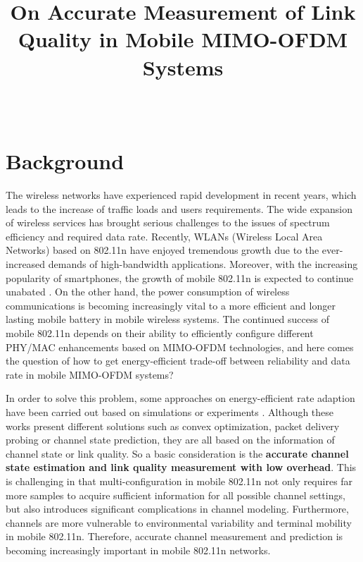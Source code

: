 \documentclass[draftclsnofoot,journal,onecolumn,11pt]{IEEEtran}
\begin{document}
\title{On Accurate Measurement of Link Quality in Mobile MIMO-OFDM Systems}
\author{ \\
}
\maketitle



\section{Background}

The wireless networks have experienced rapid development in recent years, which leads to the increase of traffic loads and users requirements. The wide expansion of wireless services has brought serious challenges to the issues of spectrum efficiency and required data rate. Recently, WLANs (Wireless Local Area Networks) based on 802.11n have enjoyed tremendous growth due to the ever-increased demands of high-bandwidth applications. Moreover, with the increasing popularity of smartphones, the growth of mobile 802.11n is expected to continue unabated \cite{Bala2010wifi}. On the other hand, the power consumption of wireless communications is becoming increasingly vital to a more efficient and longer lasting mobile battery in mobile wireless systems. The continued success of mobile 802.11n depends on their ability to efficiently configure different PHY/MAC enhancements based on MIMO-OFDM technologies, and here comes the question of how to get energy-efficient trade-off between reliability and data rate in mobile MIMO-OFDM systems?

In order to solve this problem, some approaches on energy-efficient rate adaption have been carried out based on simulations \cite{5510775} \cite{6214414} or experiments \cite{Peng:2011:TPS:2030613.2030628} \cite{Li:2012:ERA:2348543.2348585}. Although these works present different solutions such as convex optimization, packet delivery probing or channel state prediction, they are all based on the information of channel state or link quality. So a basic consideration is the \textbf{accurate channel state estimation and link quality measurement with low overhead}. This is challenging in that multi-configuration in mobile 802.11n not only requires far more samples to acquire sufficient information for all possible channel settings, but also introduces significant complications in channel modeling. Furthermore, channels are more vulnerable to environmental variability and terminal mobility in mobile 802.11n. Therefore, accurate channel measurement and prediction is becoming increasingly important in mobile 802.11n networks.
\end{document}
